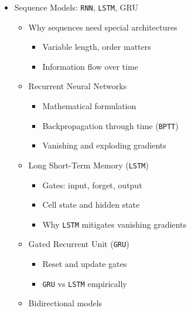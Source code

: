 \documentclass[
]{article}
\providecommand{\tightlist}{%
  \setlength{\itemsep}{0pt}\setlength{\parskip}{0pt}}
\begin{document}
\begin{itemize}
\begin{itemize}
    \begin{itemize}
    \tightlist
    \item
      Perplexity
    \item
      Cross-entropy and bits-per-character
    \item
      Downstream-task evaluation
    \end{itemize}
  \end{itemize}
\item
  Sequence Models: \texttt{RNN}, \texttt{LSTM}, GRU

  \begin{itemize}
  \tightlist
  \item
    Why sequences need special architectures

    \begin{itemize}
    \tightlist
    \item
      Variable length, order matters
    \item
      Information flow over time
    \end{itemize}
  \item
    Recurrent Neural Networks

    \begin{itemize}
    \tightlist
    \item
      Mathematical formulation
    \item
      Backpropagation through time (\texttt{BPTT})
    \item
      Vanishing and exploding gradients
    \end{itemize}
  \item
    Long Short-Term Memory (\texttt{LSTM})

    \begin{itemize}
    \tightlist
    \item
      Gates: input, forget, output
    \item
      Cell state and hidden state
    \item
      Why \texttt{LSTM} mitigates vanishing gradients
    \end{itemize}
  \item
    Gated Recurrent Unit (\texttt{GRU})

    \begin{itemize}
    \tightlist
    \item
      Reset and update gates
    \item
      \texttt{GRU} vs \texttt{LSTM} empirically
    \end{itemize}
  \item
    Bidirectional models


\end{itemize}
\end{itemize}
\end{document}
